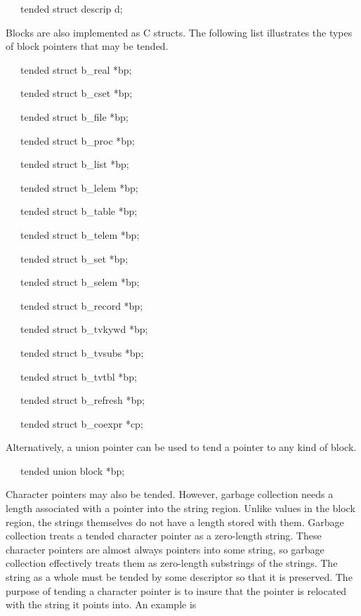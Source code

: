 {\ttfamily\mdseries
\ \ \ tended struct descrip d;}

Blocks are also implemented as C structs. The following list
illustrates the types of block pointers that may be tended.


{\ttfamily\mdseries
\ \ \ tended struct b\_real *bp;}

{\ttfamily\mdseries
\ \ \ tended struct b\_cset *bp;}

{\ttfamily\mdseries
\ \ \ tended struct b\_file *bp;}

{\ttfamily\mdseries
\ \ \ tended struct b\_proc *bp;}

{\ttfamily\mdseries
\ \ \ tended struct b\_list *bp;}

{\ttfamily\mdseries
\ \ \ tended struct b\_lelem *bp;}

{\ttfamily\mdseries
\ \ \ tended struct b\_table *bp;}

{\ttfamily\mdseries
\ \ \ tended struct b\_telem *bp;}

{\ttfamily\mdseries
\ \ \ tended struct b\_set *bp;}

{\ttfamily\mdseries
\ \ \ tended struct b\_selem *bp;}

{\ttfamily\mdseries
\ \ \ tended struct b\_record *bp;}

{\ttfamily\mdseries
\ \ \ tended struct b\_tvkywd *bp;}

{\ttfamily\mdseries
\ \ \ tended struct b\_tvsubs *bp;}

{\ttfamily\mdseries
\ \ \ tended struct b\_tvtbl *bp;}

{\ttfamily\mdseries
\ \ \ tended struct b\_refresh *bp;}

{\ttfamily\mdseries
\ \ \ tended struct b\_coexpr *cp;}


Alternatively, a union pointer can be used to tend a pointer to any
kind of block.

{\ttfamily\mdseries
\ \ \ tended union block *bp;}

Character pointers may also be tended. However, garbage collection
needs a length associated with a pointer into the string
region. Unlike values in the block region, the strings themselves do
not have a length stored with them. Garbage collection treats a tended
character pointer as a zero-length string. These character pointers
are almost always pointers into some string, so garbage collection
effectively treats them as zero-length substrings of the strings. The
string as a whole must be tended by some descriptor so that it is
preserved. The purpose of tending a character pointer is to insure
that the pointer is relocated with the string it points into. An
example is

